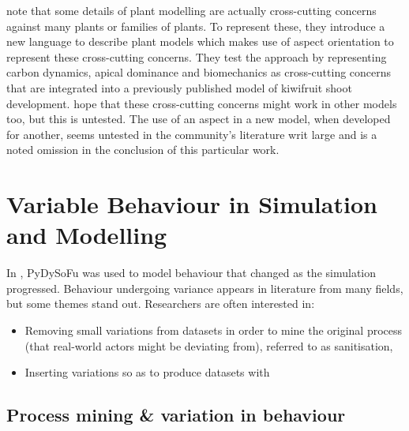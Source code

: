 \citeauthor{Cieslak_2011} note that some details of plant modelling are actually
cross-cutting concerns against many plants or families of plants. To represent
these, they introduce a new language to describe plant models which makes use of
aspect orientation to represent these cross-cutting concerns. They test the
approach by representing carbon dynamics, apical dominance and biomechanics as
cross-cutting concerns that are integrated into a previously published model of
kiwifruit shoot development. \citeauthor{Cieslak_2011} hope that these
cross-cutting concerns might work in other models too, but this is untested. The
use of an aspect in a new model, when developed for another, seems untested in
the community's literature writ large and is a noted omission in the conclusion
of this particular work.



\section{Variable Behaviour in Simulation and Modelling}\label{sec:dynamism_in_sm}

In \cite{wallis2018caise}, PyDySoFu was used to model behaviour that changed as
the simulation progressed. Behaviour undergoing variance appears in literature
from many fields, but some themes stand out. Researchers are often interested
in:

\begin{itemize}
    \item Removing small variations from datasets in order to mine the original
    process (that real-world actors might be deviating from), referred to as
    sanitisation,
    \item Inserting variations so as to produce datasets with 
\end{itemize}

\subsection{Process mining \& variation in behaviour}


